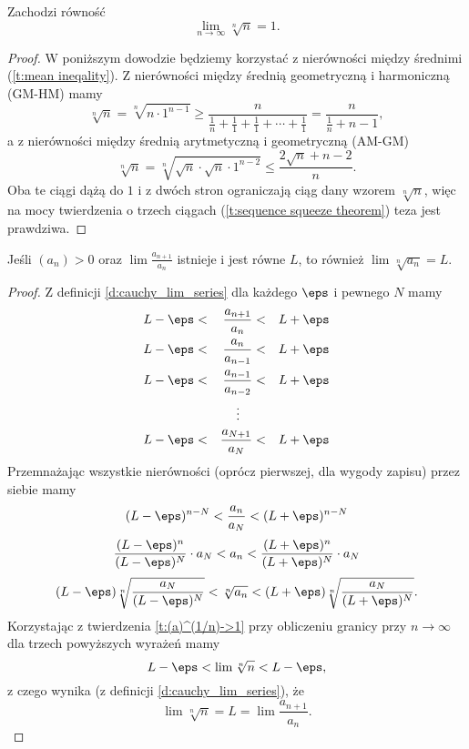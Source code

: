 \begin{theorem}
    Zachodzi równość
    \[ \lim_{n \to \infty}\sqrt[n]{n} = 1. \]
\end{theorem}
\begin{proof}
    W poniższym dowodzie będziemy korzystać z nierówności między średnimi (\ref{t:mean ineqality}). Z nierówności między średnią geometryczną i harmoniczną (GM-HM) mamy
    \[ \sqrt[n]{n} = \sqrt[n]{n \cdot 1^{n-1}} \geq \frac{n}{\frac{1}{n} + \frac{1}{1} + \frac{1}{1} + \cdots + \frac{1}{1}} = \frac{n}{\frac{1}{n} + n - 1}, \]
    a z nierówności między średnią arytmetyczną i geometryczną (AM-GM)
    \[ \sqrt[n]{n} = \sqrt[n]{\sqrt{n} \cdot \sqrt{n} \cdot 1^{n-2}} \leq \frac{2\sqrt{n} + n -2}{n}. \]
    Oba te ciągi dążą do $1$ i z dwóch stron ograniczają ciąg dany wzorem $\sqrt[n]{n}$, więc na mocy twierdzenia o trzech ciągach (\ref{t:sequence squeeze theorem}) teza jest prawdziwa.
\end{proof}

\begin{theorem}
    \label{t:lim an/a_n+1 = lim a_n^(1/n)}
    Jeśli $(a_n) > 0$ oraz $\lim\frac{a_{n+1}}{a_n}$ istnieje i jest równe $L$, to również $\lim \sqrt[n]{a_n} = L$.
\end{theorem}
\begin{proof}
    Z definicji \ref{d:cauchy_lim_series} dla każdego $\eps$ i pewnego $N$ mamy
    $$\begin{aligned}
        L - \eps &<& \frac{a_{n+1}}{a_n} &<& L + \eps \\
        L - \eps &<& \frac{a_n}{a_{n-1}} &<& L + \eps \\
        L - \eps &<& \frac{a_{n-1}}{a_{n-2}} &<& L + \eps \\
                 & & \vdots\quad  \\
        L - \eps &<& \frac{a_{N+1}}{a_N} &<& L + \eps \\
    \end{aligned}$$
    Przemnażając wszystkie nierówności (oprócz pierwszej, dla wygody zapisu) przez siebie mamy
    \[ (L - \eps)^{n-N} < \frac{a_n}{a_N} < (L + \eps)^{n-N} \]
    \[ \frac{(L - \eps)^n}{(L - \eps)^{N}} \cdot a_N < a_n < \frac{(L + \eps)^n}{(L + \eps)^{N}} \cdot a_N \]
    \[ (L - \eps)\sqrt[n]{\frac{a_N}{(L - \eps)^{N}}} < \sqrt[n]{a_n} < (L + \eps)\sqrt[n]{\frac{a_N}{(L + \eps)^{N}}}. \]
    Korzystając z twierdzenia \ref{t:(a)^(1/n)->1} przy obliczeniu granicy przy $n \to \infty$ dla trzech powyższych wyrażeń mamy
    \[ L - \eps < \lim\sqrt[n]{n} < L - \eps, \]
    z czego wynika (z definicji \ref{d:cauchy_lim_series}), że
    \[ \lim\sqrt[n]{n} = L = \lim\frac{a_{n+1}}{a_n}. \]
\end{proof}

